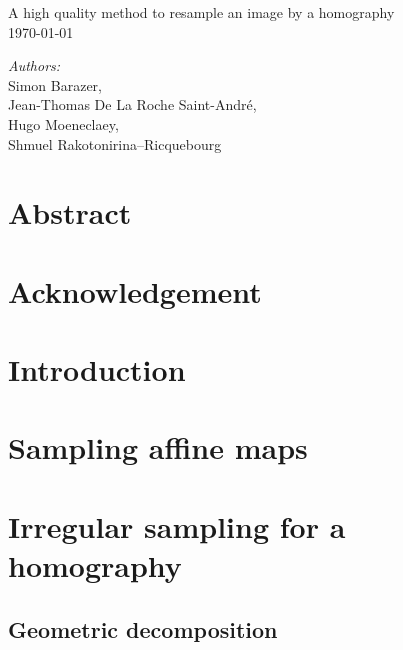 \documentclass[a4paper,11pt]{article}
\theoremstyle{plain}
\theoremstyle{definition}
\begin{document}
   	\begin{titlepage}
	\begin{center}
	\vspace*{\fill}

		\vspace{0.3cm}
		{\huge A high quality method to resample an image by a homography}\\
		\vspace{1.5cm}
	\today
	\vspace{1.5cm}


		\large
			\emph{Authors:}\\
			Simon Barazer,\\
			Jean-Thomas De La Roche Saint-André,\\
			Hugo Moeneclaey, \\
			Shmuel Rakotonirina--Ricquebourg
		
\medbreak
\medbreak
\medbreak
\medbreak
\medbreak
\medbreak

		


	\end{center}
   	\section*{Abstract}
   		
	\end{titlepage}
	\tableofcontents
		\section*{Acknowledgement}
	\section*{Introduction}%
		
	\section{Sampling affine maps}
		\label{Exposition_du_probleme}
		\label{szeliski_section}
	\section{Irregular sampling for a homography}
		\label{decomp_geo_hom}
		\subsection{Geometric decomposition}
			\label{DecompositionGeometrique}
\end{document}
